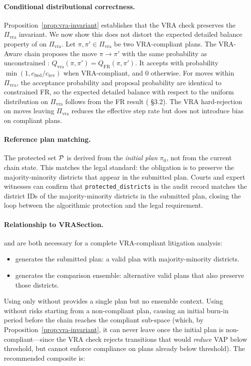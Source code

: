 \paragraph{Conditional distributional correctness.}
Proposition~\ref{prop:vra-invariant} establishes that the VRA check preserves the $\Pi_{\mathrm{vra}}$ invariant. We now show this does not distort the expected detailed balance property of \fr{} on $\Pi_{\mathrm{vra}}$. Let $\pi, \pi' \in \Pi_{\mathrm{vra}}$ be two VRA-compliant plans. The VRA-Aware chain proposes the move $\pi \to \pi'$ with the same probability as unconstrained \fr{}: $Q_{\mathrm{vra}}(\pi, \pi') = Q_{\mathrm{FR}}(\pi, \pi')$. It accepts with probability $\min(1, c_{\mathrm{fwd}}/c_{\mathrm{rev}})$ when VRA-compliant, and 0 otherwise. For moves within $\Pi_{\mathrm{vra}}$, the acceptance probability and proposal probability are identical to constrained FR, so the expected detailed balance with respect to the uniform distribution on $\Pi_{\mathrm{vra}}$ follows from the FR result (\citet{mccartan2020} \S3.2). The VRA hard-rejection on moves leaving $\Pi_{\mathrm{vra}}$ reduces the effective step rate but does not introduce bias on compliant plans.

\paragraph{Reference plan matching.}
The protected set $\mathcal{P}$ is derived from the \emph{initial plan} $\pi_0$,
not from the current chain state.
This matches the legal standard: the obligation is to preserve the
majority-minority districts that appear in the submitted plan.
Courts and expert witnesses can confirm that \texttt{protected\_districts}
in the audit record matches the district IDs of the majority-minority districts
in the submitted plan, closing the loop between the algorithmic protection
and the legal requirement.

\paragraph{Relationship to VRASection.}
\vraSection{} and \vr{} are both necessary for a complete VRA-compliant
litigation analysis:
\begin{itemize}
  \item \vraSection{} generates the submitted plan: a valid plan with
        majority-minority districts.
  \item \vr{} generates the comparison ensemble: alternative valid plans
        that also preserve those districts.
\end{itemize}
Using only \vraSection{} without \vr{} provides a single plan but no ensemble
context.
Using \vr{} without \vraSection{} risks starting from a non-compliant plan,
causing an initial burn-in period before the chain reaches the compliant
sub-space (which, by Proposition~\ref{prop:vra-invariant}, it can never leave
once the initial plan is non-compliant---since the VRA check rejects transitions
that would \emph{reduce} VAP below threshold, but cannot enforce compliance
on plans already below threshold).
The recommended composite is:

